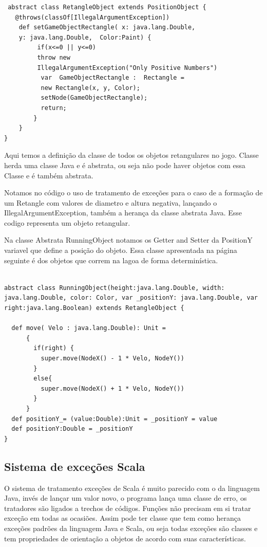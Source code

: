 \documentclass[rel-mlp]{iiufrgs}
\begin{document}
\begin{lstlisting}
 abstract class RetangleObject extends PositionObject {
   @throws(classOf[IllegalArgumentException])
    def setGameObjectRectangle( x: java.lang.Double, 
    y: java.lang.Double,  Color:Paint) {
         if(x<=0 || y<=0) 
         throw new 
         IllegalArgumentException("Only Positive Numbers")
          var  GameObjectRectangle :  Rectangle =
          new Rectangle(x, y, Color);
          setNode(GameObjectRectangle);
          return;
        }
    }
}
\end{lstlisting}

Aqui temos a definição da classe de todos os objetos retangulares no jogo. Classe herda uma classe Java e é abstrata, ou seja não pode haver objetos com essa Classe e é também abstrata.

Notamos no código o uso de tratamento de exceções para o caso de a formação de um Retangle com valores de diametro e altura negativa, lançando o IllegalArgumentException, também a herança da classe abstrata Java. Esse codigo representa um objeto retangular.

Na classe Abstrata RunningObject notamos os Getter and Setter da PositionY variavel que define a posição do objeto. Essa classe apresentada na página seguinte é dos objetos que correm na lagoa de forma determinística.

\newpage  
\begin{lstlisting}

abstract class RunningObject(height:java.lang.Double, width: java.lang.Double, color: Color, var _positionY: java.lang.Double, var right:java.lang.Boolean) extends RetangleObject {

  def move( Velo : java.lang.Double): Unit =
      {
        if(right) {
          super.move(NodeX() - 1 * Velo, NodeY())
        }
        else{
          super.move(NodeX() + 1 * Velo, NodeY())
        }
      }
  def positionY_= (value:Double):Unit = _positionY = value
  def positionY:Double = _positionY
} 
\end{lstlisting}

\newpage
\subsection{Sistema de exceções Scala}

 O sistema de tratamento exceções de Scala é muito parecido com o da linguagem Java, invés de lançar um valor novo, o programa lança uma classe de erro, os tratadores são ligados a trechos de códigos. Funções não precisam em si tratar exceção em todas as ocasiões. Assim pode ter classe que tem como herança exceções padrões da linguagem Java e Scala, ou seja todas exceções são classes e tem propriedades de orientação a objetos de acordo com suas características.
\end{document}
